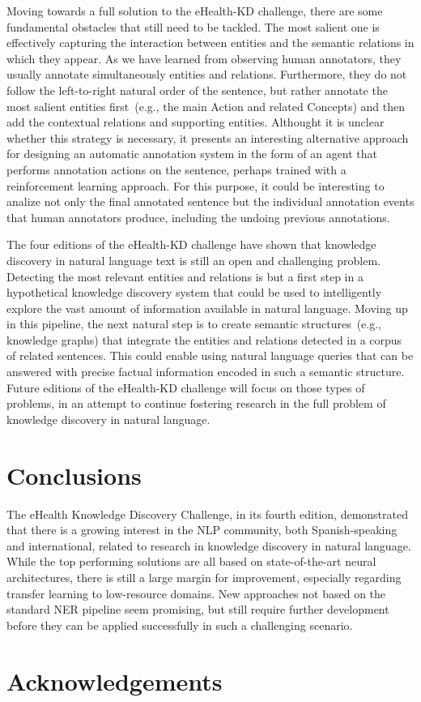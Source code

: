 \documentclass[a4paper,11pt,twocolumn,twoside]{article}
\begin{document}
Moving towards a full solution to the eHealth-KD challenge, there are some fundamental obstacles that still need to be tackled.
The most salient one is effectively capturing the interaction between entities and the semantic relations in which they appear.
As we have learned from observing human annotators, they usually annotate simultaneously entities and relations.
Furthermore, they do not follow the left-to-right natural order of the sentence, but rather annotate the most salient entities first~(e.g., the main Action and related Concepts) and then add the contextual relations and supporting entities.
Althought it is unclear whether this strategy is necessary, it presents an interesting alternative approach for designing an automatic annotation system in the form of an agent that performs annotation actions on the sentence, perhaps trained with a reinforcement learning approach.
For this purpose, it could be interesting to analize not only the final annotated sentence but the individual annotation events that human annotators produce, including the undoing previous annotations.

The four editions of the eHealth-KD challenge have shown that knowledge discovery in natural language text is still an open and challenging problem.
Detecting the most relevant entities and relations is but a first step in a hypothetical knowledge discovery system that could be used to intelligently explore the vast amount of information available in natural language.
Moving up in this pipeline, the next natural step is to create semantic structures~(e.g., knowledge graphs) that integrate the entities and relations detected in a corpus of related sentences.
This could enable using natural language queries that can be answered with precise factual information encoded in such a semantic structure.
Future editions of the eHealth-KD challenge will focus on those types of problems, in an attempt to continue fostering research in the full problem of knowledge discovery in natural language.

\section{Conclusions}\label{sec:conclusions}

The eHealth Knowledge Discovery Challenge, in its fourth edition, demonstrated that there is a growing interest in the NLP community, both Spanish-speaking and international, related to research in knowledge discovery in natural language.
While the top performing solutions are all based on state-of-the-art neural architectures, there is still a large margin for improvement, especially regarding transfer learning to low-resource domains.
New approaches not based on the standard NER pipeline seem promising, but still require further development before they can be applied successfully in such a challenging scenario.

\section*{Acknowledgements}



\end{document}
